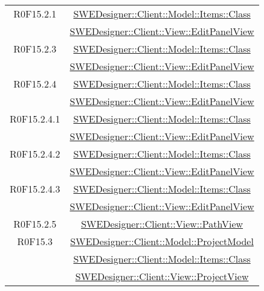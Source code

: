 \documentclass[../DefinizioneDiProdotto.tex]{subfiles}
\begin{document}
\begin{longtable}{|c|c|}
				R0F15.2.1
				& \hyperlink{SWEDesigner::Client::Model::Items::Class}{SWEDesigner::Client::Model::Items::Class}\\
				& \hyperlink{SWEDesigner::Client::View::EditPanelView}{SWEDesigner::Client::View::EditPanelView}\\
				\hline

				R0F15.2.3
				& \hyperlink{SWEDesigner::Client::Model::Items::Class}{SWEDesigner::Client::Model::Items::Class}\\
				& \hyperlink{SWEDesigner::Client::View::EditPanelView}{SWEDesigner::Client::View::EditPanelView}\\
				\hline

				R0F15.2.4
				& \hyperlink{SWEDesigner::Client::Model::Items::Class}{SWEDesigner::Client::Model::Items::Class}\\
				& \hyperlink{SWEDesigner::Client::View::EditPanelView}{SWEDesigner::Client::View::EditPanelView}\\
				\hline

				R0F15.2.4.1
				& \hyperlink{SWEDesigner::Client::Model::Items::Class}{SWEDesigner::Client::Model::Items::Class}\\
				& \hyperlink{SWEDesigner::Client::View::EditPanelView}{SWEDesigner::Client::View::EditPanelView}\\
				\hline

				R0F15.2.4.2
				& \hyperlink{SWEDesigner::Client::Model::Items::Class}{SWEDesigner::Client::Model::Items::Class}\\
				& \hyperlink{SWEDesigner::Client::View::EditPanelView}{SWEDesigner::Client::View::EditPanelView}\\
				\hline

				R0F15.2.4.3
				& \hyperlink{SWEDesigner::Client::Model::Items::Class}{SWEDesigner::Client::Model::Items::Class}\\
				& \hyperlink{SWEDesigner::Client::View::EditPanelView}{SWEDesigner::Client::View::EditPanelView}\\
				\hline

				R0F15.2.5
				& \hyperlink{SWEDesigner::Client::View::PathView}{SWEDesigner::Client::View::PathView}\\
				\hline

				R0F15.3
				& \hyperlink{SWEDesigner::Client::Model::ProjectModel}{SWEDesigner::Client::Model::ProjectModel}\\
				& \hyperlink{SWEDesigner::Client::Model::Items::Class}{SWEDesigner::Client::Model::Items::Class}\\
				& \hyperlink{SWEDesigner::Client::View::ProjectView}{SWEDesigner::Client::View::ProjectView}\\
				\hline


\end{longtable}
\end{document}
